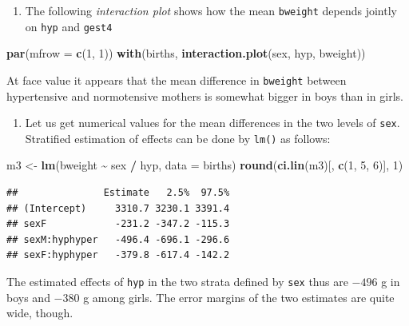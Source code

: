 \documentclass[
]{book}
\newenvironment{Shaded}{\begin{snugshade}}{\end{snugshade}}
\newcommand{\AttributeTok}[1]{\textcolor[rgb]{0.13,0.29,0.53}{#1}}
\newcommand{\DecValTok}[1]{\textcolor[rgb]{0.00,0.00,0.81}{#1}}
\newcommand{\FunctionTok}[1]{\textcolor[rgb]{0.13,0.29,0.53}{\textbf{#1}}}
\newcommand{\NormalTok}[1]{#1}
\newcommand{\OtherTok}[1]{\textcolor[rgb]{0.56,0.35,0.01}{#1}}
\newcommand{\SpecialCharTok}[1]{\textcolor[rgb]{0.81,0.36,0.00}{\textbf{#1}}}
\providecommand{\tightlist}{%
  \setlength{\itemsep}{0pt}\setlength{\parskip}{0pt}}
\begin{document}
\begin{enumerate}
\def\labelenumi{\arabic{enumi}.}
\tightlist
\item
  The following \emph{interaction plot}
  shows how the mean \texttt{bweight} depends jointly on \texttt{hyp} and \texttt{gest4}
\end{enumerate}

\begin{Shaded}
\begin{Highlighting}[]
\FunctionTok{par}\NormalTok{(}\AttributeTok{mfrow =} \FunctionTok{c}\NormalTok{(}\DecValTok{1}\NormalTok{, }\DecValTok{1}\NormalTok{))}
\FunctionTok{with}\NormalTok{(births, }\FunctionTok{interaction.plot}\NormalTok{(sex, hyp, bweight))}
\end{Highlighting}
\end{Shaded}

At face value it appears that the mean difference in \texttt{bweight} between
hypertensive and normotensive
mothers is somewhat bigger in boys than in girls.

\begin{enumerate}
\def\labelenumi{\arabic{enumi}.}
\setcounter{enumi}{1}
\tightlist
\item
  Let us get numerical values for the mean differences
  in the two levels of \texttt{sex}.
  Stratified estimation of effects can be done by \texttt{lm()} as follows:
\end{enumerate}

\begin{Shaded}
\begin{Highlighting}[]
\NormalTok{m3 }\OtherTok{\textless{}{-}} \FunctionTok{lm}\NormalTok{(bweight }\SpecialCharTok{\textasciitilde{}}\NormalTok{ sex }\SpecialCharTok{/}\NormalTok{ hyp, }\AttributeTok{data =}\NormalTok{ births)}
\FunctionTok{round}\NormalTok{(}\FunctionTok{ci.lin}\NormalTok{(m3)[, }\FunctionTok{c}\NormalTok{(}\DecValTok{1}\NormalTok{, }\DecValTok{5}\NormalTok{, }\DecValTok{6}\NormalTok{)], }\DecValTok{1}\NormalTok{)}
\end{Highlighting}
\end{Shaded}

\begin{verbatim}
##               Estimate   2.5%  97.5%
## (Intercept)     3310.7 3230.1 3391.4
## sexF            -231.2 -347.2 -115.3
## sexM:hyphyper   -496.4 -696.1 -296.6
## sexF:hyphyper   -379.8 -617.4 -142.2
\end{verbatim}

The estimated effects of \texttt{hyp} in the two strata defined by \texttt{sex} thus
are \(-496\) g in boys and \(-380\) g among girls.
The error margins of the two estimates are quite wide, though.
\end{document}
